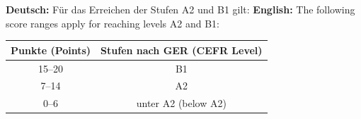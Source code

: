 \documentclass[a4paper]{article}
\begin{document}
    \textbf{Deutsch:} Für das Erreichen der Stufen A2 und B1 gilt:
    \textbf{English:} The following score ranges apply for reaching levels A2 and B1:
    
    \begin{table}[H]
        \centering
        \begin{tabular}{|c|c|}
            \hline
            Punkte (Points) & Stufen nach GER (CEFR Level) \\
            \hline
            15--20          & B1                           \\
            7--14           & A2                           \\
            0--6            & unter A2 (below A2)          \\
            \hline
        \end{tabular}
    \end{table}
\end{document}
